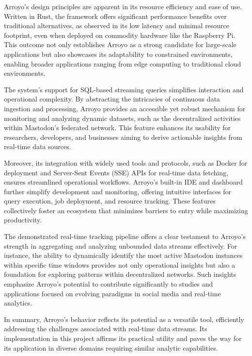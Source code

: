\documentclass[12pt, a4paper]{article}
\begin{document}
Arroyo's design principles are apparent in its resource efficiency and ease of use. Written in Rust,
the framework offers significant performance benefits over traditional alternatives, as observed in
its low latency and minimal resource footprint, even when deployed on commodity hardware like the
Raspberry Pi. This outcome not only establishes Arroyo as a strong candidate for large-scale
applications but also showcases its adaptability to constrained environments, enabling broader
applications ranging from edge computing to traditional cloud environments.

The system's support for SQL-based streaming queries simplifies interaction and operational
complexity. By abstracting the intricacies of continuous data ingestion and processing, Arroyo
provides an accessible yet robust mechanism for monitoring and analyzing dynamic datasets, such as
the decentralized activities within Mastodon's federated network. This feature enhances its
usability for researchers, developers, and businesses aiming to derive actionable insights from
real-time data sources.

Moreover, its integration with widely used tools and protocols, such as Docker for deployment and
Server-Sent Events (SSE) APIs for real-time data fetching, ensures streamlined operational
workflows. Arroyo's built-in IDE and dashboard further simplify development and monitoring, offering
intuitive interfaces for query execution, job deployment, and resource tracking. These features
collectively foster an ecosystem that minimizes barriers to entry while maximizing productivity.

The demonstrated real-time tracking pipeline offers a clear testament to Arroyo's strength in
aggregating and analyzing unbounded data streams effectively. For instance, the ability to
dynamically identify the most active Mastodon instances within specific time windows provides not
only operational insights but also a foundation for exploring patterns within decentralized
networks. Such insights emphasize Arroyo's potential to contribute significantly to studies and
applications focused on evolving paradigms in social media and real-time analytics.

In summary, Arroyo's behavior reflects its potential as a versatile tool, efficiently addressing the
challenges associated with real-time data streams. Its implementation in this project affirms its
practical utility and paves the way for its application in diverse domains requiring similar
analytic capabilities.
\end{document}
